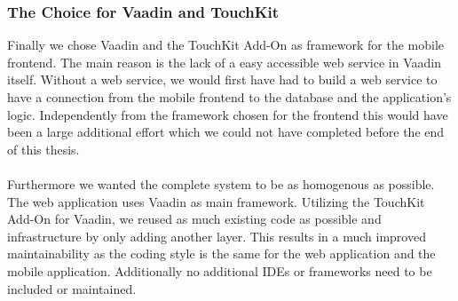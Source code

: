 \subsubsection{The Choice for Vaadin and TouchKit}
Finally we chose Vaadin and the TouchKit Add-On as framework for the mobile frontend. The main reason is the lack of a easy accessible web service in Vaadin itself. Without a web service, we would first have had to build a web service to have a connection from the mobile frontend to the database and the application's logic. Independently from the framework chosen for the frontend this would have been a large additional effort which we could not have completed before the end of this thesis.
\\
\\
Furthermore we wanted the complete system to be as homogenous as possible. The web application uses Vaadin as main framework. Utilizing the TouchKit Add-On for Vaadin, we reused as much existing code as possible and infrastructure by only adding another layer. This results in a much improved maintainability as the coding style is the same for the web application and the mobile application. Additionally no additional IDEs or frameworks need to be included or maintained.

